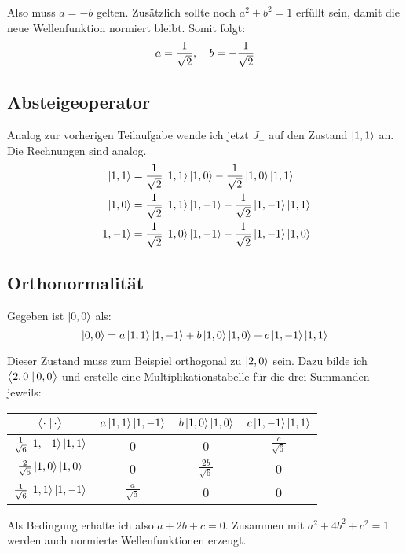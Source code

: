 Also muss $a = -b$ gelten. Zusätzlich sollte noch $a^2 + b^2 = 1$ erfüllt sein,
damit die neue Wellenfunktion normiert bleibt. Somit folgt:
\[
	a = \frac1{\sqrt 2}
	,\quad
	b = - \frac1{\sqrt 2}
\]

\subsection{Absteigeoperator}

Analog zur vorherigen Teilaufgabe wende ich jetzt $J_-$ auf den Zustand $\left| 1, 1 \right\rangle$ an. Die Rechnungen sind analog.
\begin{align*}
	\left| 1, 1 \right\rangle &= \frac1{\sqrt 2} \left| 1, 1 \right\rangle \left| 1, 0 \right\rangle - \frac1{\sqrt 2} \left| 1, 0 \right\rangle \left| 1, 1 \right\rangle \\
	\left| 1, 0 \right\rangle &= \frac1{\sqrt 2} \left| 1, 1 \right\rangle \left| 1, -1 \right\rangle - \frac1{\sqrt 2} \left| 1, -1 \right\rangle \left| 1, 1 \right\rangle \\
	\left| 1, -1 \right\rangle &= \frac1{\sqrt 2} \left| 1, 0 \right\rangle \left| 1, -1 \right\rangle - \frac1{\sqrt 2} \left| 1, -1 \right\rangle \left| 1, 0 \right\rangle
\end{align*}

\subsection{Orthonormalität}

Gegeben ist $\left| 0, 0 \right\rangle$ als:
\[
	\left| 0, 0 \right\rangle = a \left| 1, 1 \right\rangle \left| 1, -1 \right\rangle + b \left| 1, 0 \right\rangle \left| 1, 0 \right\rangle + c \left| 1, -1 \right\rangle \left| 1, 1 \right\rangle
\]

Dieser Zustand muss zum Beispiel orthogonal zu $\left| 2, 0 \right\rangle$ sein. Dazu bilde
ich $\braket{2, 0}{0, 0}$ und erstelle eine Multiplikationstabelle für die drei
Summanden jeweils:
\begin{center}
	\begin{tabular}{c|ccc}
		$\braket\cdot\cdot$ & $a \left| 1, 1 \right\rangle \left| 1, -1 \right\rangle$ & $b \left| 1, 0 \right\rangle \left| 1, 0 \right\rangle$ & $c \left| 1, -1 \right\rangle \left| 1, 1 \right\rangle$ \\
		\hline
		$\frac{1}{\sqrt6} \left| 1, -1 \right\rangle \left| 1, 1 \right\rangle$ & 0 & 0 & $\frac c{\sqrt6}$ \\
		$\frac{2}{\sqrt6} \left| 1, 0 \right\rangle \left| 1, 0 \right\rangle$ & 0 & $\frac{2b}{\sqrt6}$ & 0  \\
		$\frac{1}{\sqrt6} \left| 1, 1 \right\rangle \left| 1, -1 \right\rangle$ & $\frac{a}{\sqrt6}$ & 0 & 0  \\
	\end{tabular}
\end{center}

Als Bedingung erhalte ich also $a + 2b + c = 0$. Zusammen mit $a^2 + 4b^2 + c^2
= 1$ werden auch normierte Wellenfunktionen erzeugt.


\IfFileExists{\bibliographyfile}{
}{}



